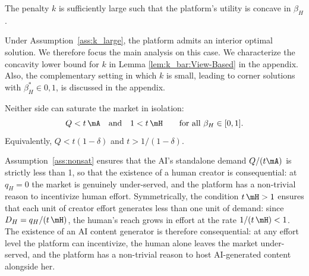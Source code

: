\begin{assumption}\label{ass:k_large}
The penalty $k$ is sufficiently large such that the platform's utility is concave in $\beta_H$.
\end{assumption}

Under Assumption~\ref{ass:k_large}, the platform admits an interior optimal solution. We therefore focus the main analysis on this case. We characterize the concavity lower bound for $k$ in Lemma \ref{lem:k_bar:View-Based} in the appendix. Also, the complementary setting in which $k$ is small, leading to corner solutions with $\beta_H^* \in {0,1}$, is discussed in the appendix.


\begin{assumption}\label{ass:nonsat}
   Neither side can saturate the market in isolation:
   \[
   Q < t\,\mA \quad \text{and} \quad 1 < t\,\mH 
   \qquad \text{for all } \beta_H \in [0,1].
   \]
   Equivalently, $Q < t(1-\delta)$ and $t > 1/(1-\delta)$.
\end{assumption}

Assumption~\ref{ass:nonsat} ensures that the AI's standalone demand 
$Q/(t\mA)$ is strictly less than 1, so that the existence of a human 
creator is consequential: at $q_H = 0$ the market is genuinely 
under-served, and the platform has a non-trivial reason to incentivize 
human effort. Symmetrically, the condition $t\,\mH > 1$ ensures that 
each unit of creator effort generates less than one unit of demand: 
since $D_H = q_H/(t\,\mH)$, the human's reach grows in effort at the 
rate $1/(t\,\mH) < 1$. The existence of an AI content generator is 
therefore consequential: at any effort level the platform can 
incentivize, the human alone leaves the market under-served, and the 
platform has a non-trivial reason to host AI-generated content 
alongside her. 



